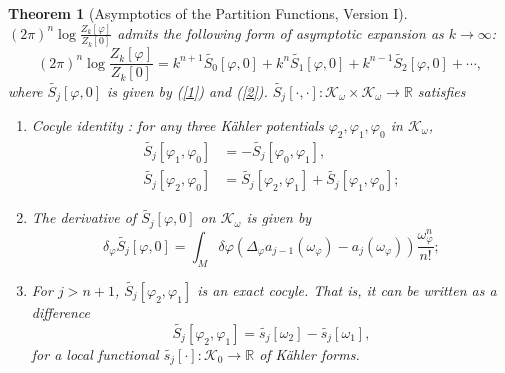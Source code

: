\documentclass[12pt,reqno,a4paper]{amsart}
\numberwithin{equation}{section}
\newtheorem{thm}{{\sc Theorem}}[section]
\theoremstyle{remark}
\theoremstyle{dotless}
\begin{document}
\begin{thm}[Asymptotics of the Partition Functions, Version I]
$(2\pi)^n\log \frac{Z_k[\varphi]}{Z_k[0]}$ admits the following form of asymptotic expansion as $k\rightarrow\infty$:
\begin{equation}\label{ver1}
(2\pi)^n\log \frac{Z_k[\varphi]}{Z_k[0]}=k^{n+1}\widetilde{S_0}[\varphi,0]+k^{n}\widetilde{S_1}[\varphi,0]+k^{n-1}\widetilde{S_2}[\varphi,0]+\cdots,
\end{equation}
where $\widetilde{S_j}[\varphi,0]$ is given by (\ref{1}) and (\ref{2}). $\widetilde{S_j}[\cdot,\cdot]:\mathcal{K}_\omega\times\mathcal{K}_\omega\rightarrow\mathbb{R}$ satisfies
\begin{enumerate}
    \item Cocyle identity : for any three K\"ahler potentials $\varphi_2, \varphi_1, \varphi_0$ in $\mathcal{K}_\omega$,
    \begin{align*}
\widetilde{S_j}[\varphi_1,\varphi_0]&=-\widetilde{S_j}[\varphi_0,\varphi_1],\\   
\widetilde{S_j}[\varphi_2,\varphi_0]&=\widetilde{S_j}[\varphi_2,\varphi_1]+\widetilde{S_j}[\varphi_1,\varphi_0];
    \end{align*}
    \item The derivative of $\widetilde{S_j}[\varphi,0]$ on $\mathcal{K}_\omega$ is given by
\begin{equation}\label{firstvariver1}
\delta_\varphi \widetilde{S_j}[\varphi,0]=\int_M \delta\varphi \left( \Delta_\varphi a_{j-1}(\omega_\varphi)-a_{j}(\omega_\varphi) \right) \frac{\omega_\varphi^n}{n!};
\end{equation}
    \item For $j>n+1$, $\widetilde{S_j}[\varphi_2,\varphi_1]$ is an exact cocyle. That is, it can be written as a difference
\begin{equation*}
\widetilde{S_j}[\varphi_2,\varphi_1]=\widetilde{s_j}[\omega_2]-\widetilde{s_j}[\omega_1],
\end{equation*}
for a local functional $\widetilde{s_j}[\cdot] : \mathcal{K}_0\rightarrow\mathbb{R}$ of K\"ahler forms.
\end{enumerate}
\end{thm}
\end{document}
